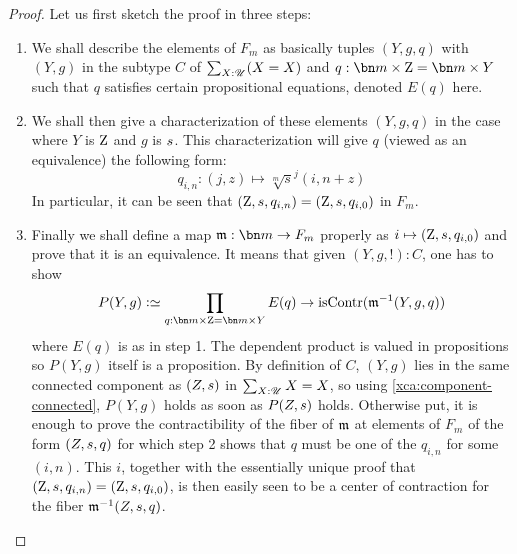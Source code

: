 \begin{proof}
  Let us first sketch the proof in three steps:
  \begin{enumerate}[label={\sc Step \arabic*}.]
  \item We shall describe the elements of $F_m$ as basically tuples
    $(Y,g,q)$ with $(Y,g)$ in the subtype $C$ of $\sum_{X:{\mathscr{U}}}(X=X)$
    and $q:\bn m\times \zet = \bn m\times Y$ such that $q$ satisfies
    certain propositional equations, denoted $E(q)$ here.
  \item We shall then give a characterization of these elements
    $(Y,g,q)$ in the case where $Y$ is $\mathrm{Z}$ and $g$ is ${s}$. This characterization will give $q$ (viewed as an equivalence)
    the following form:
    \begin{displaymath}
      q_{i,n}: (j,z) \mapsto {\sqrt[m]s}^j(i,n+z)
    \end{displaymath}
    In particular, it can be seen that
    $(\mathrm{Z},{s},q_{i,n}) = (\mathrm{Z},{s},q_{i,0})$ in $F_m$.
  \item Finally we shall define a map $\myq: \bn m \to F_m$ properly
    as $i\mapsto (\mathrm{Z},{s},q_{i,0})$ and prove that it is an
    equivalence. It means that given $(Y,g,!):C$, one has to show
    \begin{displaymath}
      P(Y,g) \defequi \prod_{q:\bn m \times \zet = \bn m \times Y}E(q)\to\iscontr(\inv{\myq}(Y,g,q))
    \end{displaymath}
    where $E(q)$ is as in step 1. The dependent product is valued in
    propositions so $P(Y,g)$ itself is a proposition. By definition of
    $C$, $(Y,g)$ lies in the same connected component as $(Z,{s})$
    in $\sum_{X:{\mathscr{U}}}X=X$, so using \cref{xca:component-connected},
    $P(Y,g)$ holds as soon as $P(Z,{s})$ holds. Otherwise put, it
    is enough to prove the contractibility of the fiber of $\mathfrak m$ at
    elements of $F_m$ of the form $(Z,{s},q)$ for which step 2
    shows that $q$ must be one of the $q_{i,n}$ for some $(i,n)$. This
    $i$, together with the essentially unique proof that
    $(\mathrm{Z},{s}, q_{i,n}) = (\mathrm{Z},{s}, q_{i,0})$, is then
    easily seen to be a center of contraction for the fiber
    $\mathfrak m^{-1}(Z,{s}, q)$.
  \end{enumerate}


\end{proof}
